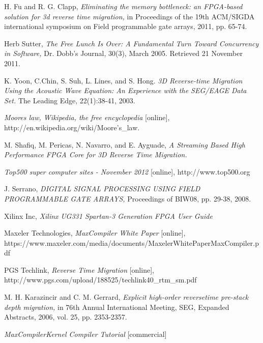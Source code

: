 \begin{thebibliography}{9}
     H. Fu and R. G. Clapp, \emph{Eliminating the memory
    bottleneck: an FPGA-based solution for 3d reverse time migration,}
    in Proceedings of the 19th ACM/SIGDA international symposium on Field
    programmable gate arrays, 2011, pp. 65-74.

     Herb Sutter, \emph{The Free Lunch Is Over: A Fundamental
    Turn Toward Concurrency in Software,} Dr. Dobb's Journal, 30(3), March
    2005. Retrieved 21 November 2011.

     K. Yoon, C.Chin, S. Suh, L. Lines, and S. Hong.
    \emph{3D Reverse-time Migration Using the Acoustic Wave Equation:
    An Experience with the SEG/EAGE Data Set.} The Leading Edge, 22(1):38-41,
    2003.

    \emph{Moores law, Wikipedia, the free encyclopedia} [online],
    http://en.wikipedia.org/wiki/Moore's\_law.

     M. Shafiq, M. Pericas, N. Navarro, and E. Ayguade,
    \emph{A Streaming Based High Performance FPGA Core for 3D Reverse
    Time Migration.}

    \emph{Top500 super computer sites - November 2012} [online],
    http://www.top500.org

    J. Serrano,
    \emph{DIGITAL SIGNAL PROCESSING USING FIELD PROGRAMMABLE GATE ARRAYS,}
    Proceedings of BIW08, pp. 29-38, 2008.

    Xilinx Inc,
    \emph{Xilinx UG331 Spartan-3 Generation FPGA User Guide}

    Maxeler Technologies,
    \emph{MaxCompiler White Paper} [online],
    https://www.maxeler.com/media/documents/MaxelerWhitePaperMaxCompiler.pdf

    PGS Techlink,
    \emph{Reverse Time Migration} [online],
    http://www.pgs.com/upload/188525/techlink40\_rtm\_sm.pdf

    M. H. Karazincir and C. M. Gerrard,
    \emph{Explicit high-order reversetime pre-stack depth migration,}
    in 76th Annual International Meeting, SEG, Expanded Abstracts, 2006,
    vol. 25, pp. 2353-2357.

    \emph{MaxCompilerKernel Compiler Tutorial} [commercial]

\end{thebibliography}
